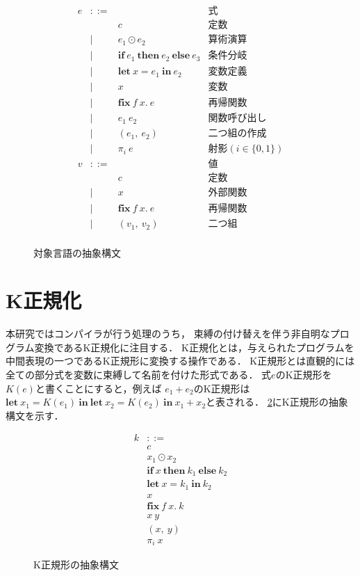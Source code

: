\documentclass[T]{compsoft}
\newcommand{\keyword}[1]{\mathbf{#1}}
\newcommand{\IF}{\keyword{if}}
\newcommand{\THEN}{\keyword{then}}
\newcommand{\ELSE}{\keyword{else}}
\newcommand{\LET}{\keyword{let}}
\newcommand{\FIX}{\keyword{fix}}
\newcommand{\IN}{\keyword{in}}
\begin{document}
\begin{figure}[tp]
	\[ \begin{array}{lcll}
		e & ::= & & \mbox{式} \\
				& & c	& \mbox{定数} \\
				& | & e_1 \odot e_2 & \mbox{算術演算} \\
				& | & \IF~e_1~\THEN~e_2~\ELSE~e_3 & \mbox{条件分岐} \\
				& | & \LET~x=e_1~\IN~e_2 & \mbox{変数定義} \\
				& | & x & \mbox{変数} \\
				& | & \FIX~f~x.~e & \mbox{再帰関数} \\
				& | & e_1~e_2 & \mbox{関数呼び出し} \\
				& | & (e_1,~e_2) & \mbox{二つ組の作成} \\
				& | & \pi_i~e & \mbox{射影}(i \in \{0, 1\}) \\
			v & ::= & & \mbox{値} \\
				& & c & \mbox{定数} \\
				& | & x & \mbox{外部関数} \\
				& | & \FIX~f~x.~e & \mbox{再帰関数} \\
				& | & (v_1,~v_2) & \mbox{二つ組} \\
	\end{array} \]
	\caption{対象言語の抽象構文}
	\label{eqn:mincaml-ast}
\end{figure}

\section{K正規化}\label{section:knormal}
本研究ではコンパイラが行う処理のうち，
束縛の付け替えを伴う非自明なプログラム変換であるK正規化に注目する．
K正規化とは，与えられたプログラムを中間表現の一つであるK正規形\cite{Birkedal:1996:RIV:237721.237771}に変換する操作である．
K正規形とは直観的には全ての部分式を変数に束縛して名前を付けた形式である．
式$e$のK正規形を$K(e)$と書くことにすると，例えば
$e_1+e_2$のK正規形は$\LET~x_1=K(e_1)~\IN~\LET~x_2=K(e_2)~\IN~x_1+x_2$と表される．
\figurename\ref{eqn:mincaml-knormal}にK正規形の抽象構文を示す．

\begin{figure}[tp]
	\[ \begin{array}{ll}
			k & ::= \\
				& c \\
				& x_1 \odot x_2 \\
				& \IF~x~\THEN~k_1~\ELSE~k_2 \\
			 	& \LET~x=k_1~\IN~k_2 \\
				& x \\
				& \FIX~f~x.~k \\
				& x~y \\
				& (x,~y) \\
				& \pi_i~x 
	\end{array} \]
	\caption{K正規形の抽象構文}
	\label{eqn:mincaml-knormal}
\end{figure}
\end{document}
